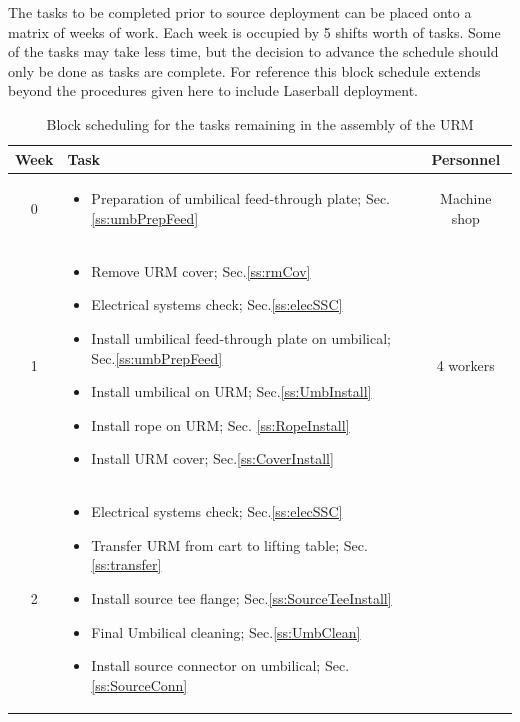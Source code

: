 \documentclass[11pt]{article}
\begin{document}
The tasks to be completed prior to source deployment can be placed onto a matrix of weeks of work. Each week is occupied by 5 shifts worth of tasks. Some of the tasks may take less time, but the decision to advance the schedule should only be done as tasks are complete. For reference this block schedule extends beyond the procedures given here to include Laserball deployment. 
\begin{table}
  \caption{Block scheduling for the tasks remaining in the assembly of the URM}
  \begin{tabular}{|c|p{13cm}|c|}
    \hline
    Week & Task & Personnel \\
    \hline
    0 & \vspace{-0.7cm} \begin{itemize}[label={$\square$}]
    \item Preparation of umbilical feed-through plate; Sec.\ref{ss:umbPrepFeed} \end{itemize} \vspace{-0.5cm} & Machine shop \\ \hline
    1 & \vspace{-0.7cm} \begin{itemize}[label={$\square$}]
    \item Remove URM cover; Sec.\ref{ss:rmCov}
    \item Electrical systems check; Sec.\ref{ss:elecSSC} 
    \item Install umbilical feed-through plate on umbilical; Sec.\ref{ss:umbPrepFeed} 
    \item Install umbilical on URM; Sec.\ref{ss:UmbInstall}
    \item Install rope on URM; Sec. \ref{ss:RopeInstall} 
    \item Install URM cover; Sec.\ref{ss:CoverInstall} 
    \end{itemize} \vspace{-0.5cm} 
    & 4 workers \\\hline
    2 & \vspace{-0.7cm}\begin{itemize}[label={$\square$}]
    \item Electrical systems check; Sec.\ref{ss:elecSSC}
    \item Transfer URM from cart to lifting table; Sec.\ref{ss:transfer}
    \item Install source tee flange; Sec.\ref{ss:SourceTeeInstall}
    \item Final Umbilical cleaning; Sec.\ref{ss:UmbClean}
    \item Install source connector on umbilical; Sec.\ref{ss:SourceConn}

\end{itemize}
\end{tabular}
\end{table}
\end{document}
